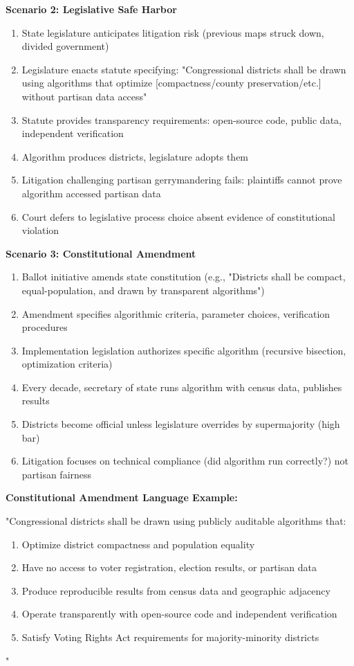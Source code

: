 \textbf{Scenario 2: Legislative Safe Harbor}

\begin{enumerate}
\item State legislature anticipates litigation risk (previous maps struck down, divided government)
\item Legislature enacts statute specifying: "Congressional districts shall be drawn using algorithms that optimize [compactness/county preservation/etc.] without partisan data access"
\item Statute provides transparency requirements: open-source code, public data, independent verification
\item Algorithm produces districts, legislature adopts them
\item Litigation challenging partisan gerrymandering fails: plaintiffs cannot prove algorithm accessed partisan data
\item Court defers to legislative process choice absent evidence of constitutional violation
\end{enumerate}

\textbf{Scenario 3: Constitutional Amendment}

\begin{enumerate}
\item Ballot initiative amends state constitution (e.g., "Districts shall be compact, equal-population, and drawn by transparent algorithms")
\item Amendment specifies algorithmic criteria, parameter choices, verification procedures
\item Implementation legislation authorizes specific algorithm (recursive bisection, optimization criteria)
\item Every decade, secretary of state runs algorithm with census data, publishes results
\item Districts become official unless legislature overrides by supermajority (high bar)
\item Litigation focuses on technical compliance (did algorithm run correctly?) not partisan fairness
\end{enumerate}

\textbf{Constitutional Amendment Language Example:}

"Congressional districts shall be drawn using publicly auditable algorithms that:
\begin{enumerate}
\item Optimize district compactness and population equality
\item Have no access to voter registration, election results, or partisan data
\item Produce reproducible results from census data and geographic adjacency
\item Operate transparently with open-source code and independent verification
\item Satisfy Voting Rights Act requirements for majority-minority districts
\end{enumerate}"

